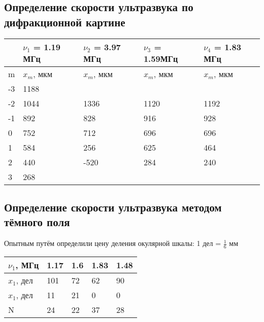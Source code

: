 \documentclass[a4paper, 12pt]{article}
\begin{document}
\subsection{Определение скорости ультразвука по дифракционной картине}
\begin{table}[]
\begin{tabular}{|l|l|l|l|l|}
\hline
   & $\nu_{1}$ = 1.19 МГц & $\nu_{2}$ = 3.97 МГц & $\nu_{3}$ = 1.59МГц & $\nu_{4}$ = 1.83 МГц \\ \hline
m  & $x_{m}$, мкм         & $x_{m}$, мкм         & $x_{m}$, мкм        & $x_{m}$, мкм         \\ \hline
-3 & 1188                 &                      &                     &                      \\ \hline
-2 & 1044                 & 1336                 & 1120                & 1192                 \\ \hline
-1 & 892                  & 828                  & 916                 & 928                  \\ \hline
0  & 752                  & 712                  & 696                 & 696                  \\ \hline
1  & 584                  & 256                  & 625                 & 464                  \\ \hline
2  & 440                  & -520                 & 284                 & 240                  \\ \hline
3  & 268                  &                      &                     &                      \\ \hline
\end{tabular}
\end{table}
\newpage



\subsection{Определение скорости ультразвука методом тёмного поля}
Опытным путём определили цену деления окулярной шкалы: 1 дел = $\frac{1}{6}$ мм
\par
\begin{table}[h]
\begin{tabular}{|l|l|l|l|l|}
\hline
$\nu_{1}$, МГц & 1.17 & 1.6 & 1.83 & 1.48 \\ \hline
$x_{1}$, дел   & 101  & 72  & 62   & 90   \\ \hline
$x_{1}$, дел   & 11   & 21  & 0    & 0    \\ \hline
N              & 24   & 22  & 37   & 28   \\ \hline
\end{tabular}
\end{table}
\end{document}
